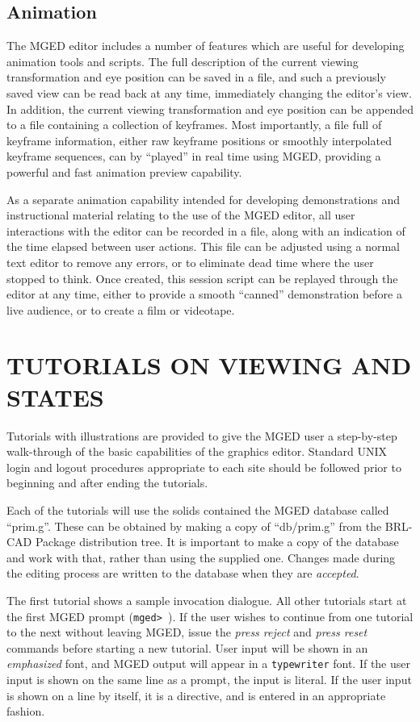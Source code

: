 \section{Animation}

The MGED editor includes a number of features which are useful
for developing animation tools and scripts.
The full description of the current viewing transformation and eye position
can be saved in a file,
and such a previously saved view can be read back at any time,
immediately changing the editor's view.
In addition, the current viewing transformation and eye position can be
appended to a file containing a collection of keyframes.
Most importantly, a file full of keyframe information, either raw keyframe
positions or smoothly interpolated keyframe sequences, can
by ``played'' in real time using MGED,
providing a powerful and fast animation preview capability.

As a separate animation capability intended
for developing demonstrations and instructional material relating to the
use of the MGED editor,
all user interactions with the editor can be recorded in a file,
along with an indication of the time elapsed between user actions.
This file can be  adjusted using a normal text editor to remove any errors,
or to eliminate dead time where the user stopped to think.
Once created, this session script can be replayed through the editor
at any time, either to provide a smooth ``canned'' demonstration
before a live audience, or to create a film or videotape.
\chapter{TUTORIALS ON VIEWING AND STATES}

Tutorials with illustrations are provided to give the MGED user a
step-by-step walk-through of the basic capabilities of the graphics
editor.
Standard UNIX login and logout procedures appropriate to each site
should be followed prior to
beginning and after ending the tutorials.

Each of the tutorials will use the solids contained the MGED database called
``prim.g''.
These can be obtained by making a copy of ``db/prim.g''
from the BRL-CAD Package distribution tree.  It is important to make
a copy of the database and work with that, rather than using the
supplied one.  Changes made during the editing process are written
to the database when they are {\sl accepted}.

The first tutorial shows a sample invocation dialogue.  All other
tutorials start at the first MGED prompt ({\tt mged> }). If the user
wishes to continue from one tutorial to the next without leaving MGED,
issue the {\em press reject} and {\em press reset} commands
before starting a new tutorial.
User input will be shown in an
{\em emphasized} font, and MGED output will appear in a {\tt typewriter}
font.  If the user input is shown on the same line as a prompt, the
input is literal.  If the user input is shown on a line by itself,
it is a directive, and is entered in an appropriate fashion.

